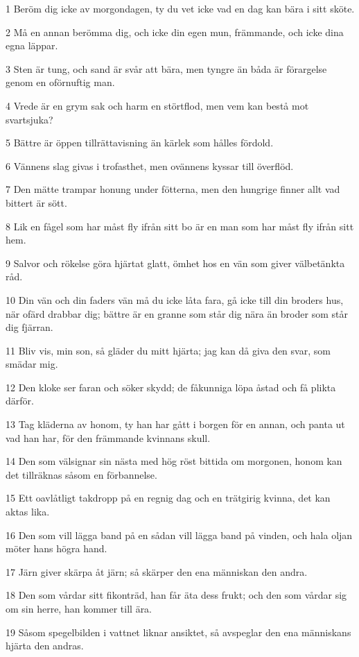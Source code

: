 \par 1 Beröm dig icke av morgondagen, ty du vet icke vad en dag kan bära i sitt sköte.
\par 2 Må en annan berömma dig, och icke din egen mun, främmande, och icke dina egna läppar.
\par 3 Sten är tung, och sand är svår att bära, men tyngre än båda är förargelse genom en oförnuftig man.
\par 4 Vrede är en grym sak och harm en störtflod, men vem kan bestå mot svartsjuka?
\par 5 Bättre är öppen tillrättavisning än kärlek som hålles fördold.
\par 6 Vännens slag givas i trofasthet, men ovännens kyssar till överflöd.
\par 7 Den mätte trampar honung under fötterna, men den hungrige finner allt vad bittert är sött.
\par 8 Lik en fågel som har måst fly ifrån sitt bo är en man som har måst fly ifrån sitt hem.
\par 9 Salvor och rökelse göra hjärtat glatt, ömhet hos en vän som giver välbetänkta råd.
\par 10 Din vän och din faders vän må du icke låta fara, gå icke till din broders hus, när ofärd drabbar dig; bättre är en granne som står dig nära än broder som står dig fjärran.
\par 11 Bliv vis, min son, så gläder du mitt hjärta; jag kan då giva den svar, som smädar mig.
\par 12 Den kloke ser faran och söker skydd; de fåkunniga löpa åstad och få plikta därför.
\par 13 Tag kläderna av honom, ty han har gått i borgen för en annan, och panta ut vad han har, för den främmande kvinnans skull.
\par 14 Den som välsignar sin nästa med hög röst bittida om morgonen, honom kan det tillräknas såsom en förbannelse.
\par 15 Ett oavlåtligt takdropp på en regnig dag och en trätgirig kvinna, det kan aktas lika.
\par 16 Den som vill lägga band på en sådan vill lägga band på vinden, och hala oljan möter hans högra hand.
\par 17 Järn giver skärpa åt järn; så skärper den ena människan den andra.
\par 18 Den som vårdar sitt fikonträd, han får äta dess frukt; och den som vårdar sig om sin herre, han kommer till ära.
\par 19 Såsom spegelbilden i vattnet liknar ansiktet, så avspeglar den ena människans hjärta den andras.
